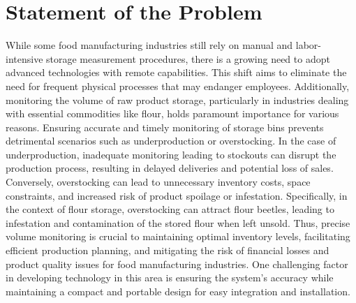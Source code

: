 \section{Statement of the Problem}
\label{intro:sec:Statement of the Problem}

While some food manufacturing industries still rely on manual and labor-intensive storage measurement procedures, there is a growing need to adopt advanced technologies with remote capabilities. This shift aims to eliminate the need for frequent physical processes that may endanger employees. Additionally, monitoring the volume of raw product storage, particularly in industries dealing with essential commodities like flour, holds paramount importance for various reasons. Ensuring accurate and timely monitoring of storage bins prevents detrimental scenarios such as underproduction or overstocking. In the case of underproduction, inadequate monitoring leading to stockouts can disrupt the production process, resulting in delayed deliveries and potential loss of sales. Conversely, overstocking can lead to unnecessary inventory costs, space constraints, and increased risk of product spoilage or infestation. Specifically, in the context of flour storage, overstocking can attract flour beetles, leading to infestation and contamination of the stored flour when left unsold. Thus, precise volume monitoring is crucial to maintaining optimal inventory levels, facilitating efficient production planning, and mitigating the risk of financial losses and product quality issues for food manufacturing industries. One challenging factor in developing technology in this area is ensuring the system's accuracy while maintaining a compact and portable design for easy integration and installation.

